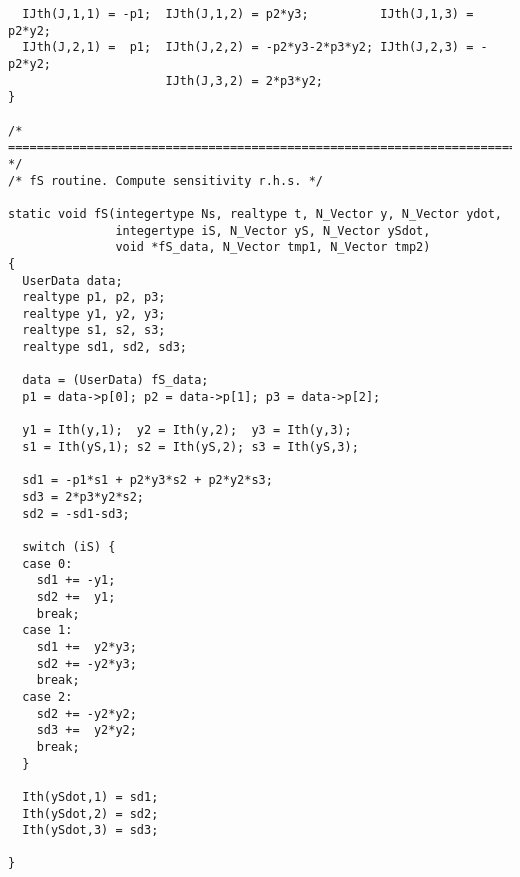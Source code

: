 \begin{verbatim}
  IJth(J,1,1) = -p1;  IJth(J,1,2) = p2*y3;          IJth(J,1,3) = p2*y2;
  IJth(J,2,1) =  p1;  IJth(J,2,2) = -p2*y3-2*p3*y2; IJth(J,2,3) = -p2*y2;
                      IJth(J,3,2) = 2*p3*y2;
}
 
/* ======================================================================= */
/* fS routine. Compute sensitivity r.h.s. */

static void fS(integertype Ns, realtype t, N_Vector y, N_Vector ydot, 
               integertype iS, N_Vector yS, N_Vector ySdot, 
               void *fS_data, N_Vector tmp1, N_Vector tmp2)
{
  UserData data;
  realtype p1, p2, p3;
  realtype y1, y2, y3;
  realtype s1, s2, s3;
  realtype sd1, sd2, sd3;

  data = (UserData) fS_data;
  p1 = data->p[0]; p2 = data->p[1]; p3 = data->p[2];

  y1 = Ith(y,1);  y2 = Ith(y,2);  y3 = Ith(y,3);
  s1 = Ith(yS,1); s2 = Ith(yS,2); s3 = Ith(yS,3);

  sd1 = -p1*s1 + p2*y3*s2 + p2*y2*s3;
  sd3 = 2*p3*y2*s2;
  sd2 = -sd1-sd3;

  switch (iS) {
  case 0:
    sd1 += -y1;
    sd2 +=  y1;
    break;
  case 1:
    sd1 +=  y2*y3;
    sd2 += -y2*y3;
    break;
  case 2:
    sd2 += -y2*y2;
    sd3 +=  y2*y2;
    break;
  }
  
  Ith(ySdot,1) = sd1;
  Ith(ySdot,2) = sd2;
  Ith(ySdot,3) = sd3;

}
\end{verbatim}